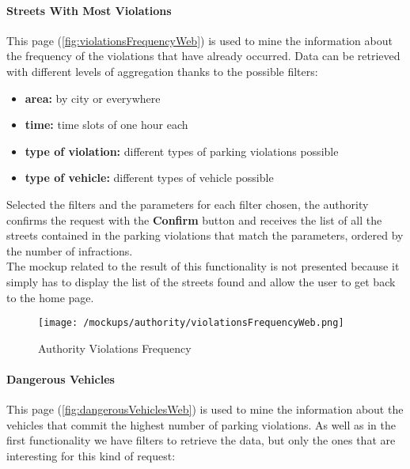				\paragraph{Streets With Most Violations}
				This page (\autoref{fig:violationsFrequencyWeb}) is used to mine the information about the frequency of the violations that have already occurred. Data can be retrieved with different levels of aggregation thanks to the possible filters:
				
				\begin{itemize}
					\item \textbf{area:} by city or everywhere
					\item \textbf{time:} time slots of one hour each
					\item \textbf{type of violation:} different types of parking violations possible
					\item \textbf{type of vehicle:} different types of vehicle possible
				\end{itemize}
			
				Selected the filters and the parameters for each filter chosen, the authority confirms the request with the \textbf{Confirm} button and receives the list of all the streets contained in the parking violations  that match the parameters, ordered by the number of infractions.\\
				
				The mockup related to the result of this functionality is not presented because it simply has to display the list of the streets found and allow the user to get back to the home page.
				
				\vspace{0.1cm}
				
				\begin{figure}[ht!]
					\centering
					\texttt{[image: /mockups/authority/violationsFrequencyWeb.png]}
					\caption{\label{fig:violationsFrequencyWeb} Authority Violations Frequency}
				\end{figure}
				
				\paragraph{Dangerous Vehicles}
				This page (\autoref{fig:dangerousVehiclesWeb}) is used to mine the information about the vehicles that commit the highest number of parking violations. As well as in the first functionality we have filters to retrieve the data, but only the ones that are interesting for this kind of request:
				
